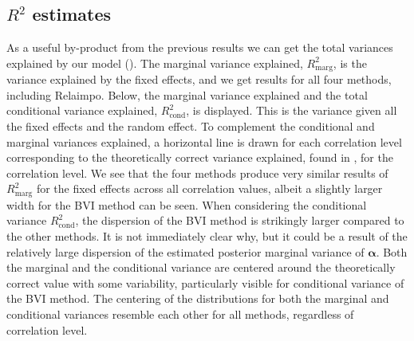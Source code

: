 \subsection{\texorpdfstring{$R^2$}{Lg} estimates}
\label{sec:R2} 
As a useful by-product from the previous results we can get the total variances explained by our model ().
The marginal variance explained, $R^2_{\text{marg}}$, is the variance explained by the fixed effects, and we get results for all four methods, including Relaimpo.
Below, the marginal variance explained and the total conditional variance explained, $R^2_{\text{cond}}$, is displayed. 
This is the variance given all the fixed effects and the random effect.
To complement the conditional and marginal variances explained, a horizontal line is drawn for each correlation level corresponding to the theoretically correct variance explained, found in , for the correlation level. 
\newline
\newline
We see that the four methods produce very similar results of $R^2_{\text{marg}}$ for the fixed effects across all correlation values, albeit a slightly larger width for the BVI method can be seen.
When considering the conditional variance $R^2_{\text{cond}}$, the dispersion of the BVI method is strikingly larger compared to the other methods. 
It is not immediately clear why, but it could be a result of the relatively large dispersion of the estimated posterior marginal variance of $\boldsymbol{\alpha}$.
Both the marginal and the conditional variance are centered around the theoretically correct value with some variability, particularly visible for conditional variance of the BVI method. 
The centering of the distributions for both the marginal and conditional variances resemble each other for all methods, regardless of correlation level.
